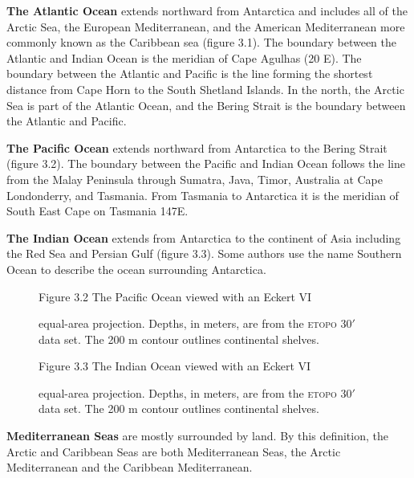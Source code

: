 \textbf{The Atlantic Ocean} extends
northward from Antarctica and includes all of the Arctic Sea, the
European Mediterranean, and the American Mediterranean more commonly
known as the Caribbean sea (figure 3.1). The boundary between the
Atlantic and Indian Ocean is the meridian of Cape Agulhas (20\degrees
E). The boundary between the Atlantic and Pacific is the line forming
the shortest distance from Cape Horn to the South Shetland Islands. In
the north, the Arctic Sea is part of the Atlantic Ocean, and the
Bering Strait is the boundary between the Atlantic and Pacific.

\textbf{The Pacific Ocean} extends
northward from Antarctica to the Bering Strait (figure 3.2). The
boundary between the Pacific and Indian Ocean follows the line from
the Malay Peninsula through Sumatra, Java, Timor, Australia at Cape
Londonderry, and Tasmania. From Tasmania to Antarctica it is the
meridian of South East Cape on Tasmania 147\degrees E.

\textbf{The Indian Ocean} extends from
Antarctica to the continent of Asia including the Red Sea and Persian
Gulf (figure 3.3). Some authors use the name Southern Ocean to
describe the ocean surrounding Antarctica.

\begin{figure}[t!]
\centering
\footnotesize
Figure 3.2 The Pacific Ocean viewed with an Eckert VI\rule{0mm}{3ex}
equal-area projection. Depths, in meters, are from the \textsc{etopo}
30$'$ data set. The 200 m contour outlines continental shelves.

\label{fig:pacific}
\vspace{-4ex}
\end{figure}

\begin{figure}[t!]
\footnotesize
\centering
Figure 3.3 The Indian Ocean viewed with an Eckert VI\rule{0pt}{3ex}
equal-area projection. Depths, in meters, are from the \textsc{etopo}
30$'$ data set. The 200 m contour outlines continental shelves.

\label{fig:indian}
\vspace{-4ex}
\end{figure}

\textbf{Mediterranean Seas} are mostly
surrounded by land. By this definition, the Arctic and Caribbean Seas
are both Mediterranean Seas, the Arctic Mediterranean and the
Caribbean Mediterranean.

